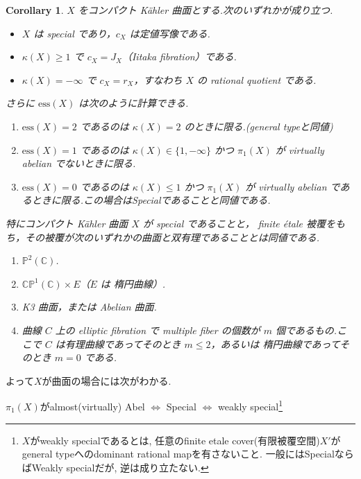 \documentclass[dvipdfmx,a4paper,11pt]{article} %
\newtheorem{cor}[thm]{Corollary}
\theoremstyle{definition}
\theoremstyle{remark}
\numberwithin{equation}{section}
\newcommand{\C}{\mathbb{C}}
\begin{document}
\begin{cor}\cite[Corollary 3.32, 3.33]{Cam04}
\(X\) をコンパクト Kähler 曲面とする.次のいずれかが成り立つ.
\begin{itemize}
\item \(X\) は special であり，\(c_X\) は定値写像である.
\item \(\kappa(X)\geq 1\) で \(c_X=J_X\)（Iitaka fibration）である.
\item \(\kappa(X)=-\infty\) で \(c_X=r_X\)，すなわち \(X\) の rational quotient である.
\end{itemize}
さらに \(\mathrm{ess}(X)\) は次のように計算できる.
\begin{enumerate}
\item \(\mathrm{ess}(X)=2\) であるのは \(\kappa(X)=2\) のときに限る.(general typeと同値)
\item \(\mathrm{ess}(X)=1\) であるのは \(\kappa(X)\in\{1,-\infty\}\) かつ \(\pi_1(X)\) が virtually abelian でないときに限る.
\item \(\mathrm{ess}(X)=0\) であるのは \(\kappa(X)\leq 1\) かつ \(\pi_1(X)\) が virtually abelian であるときに限る.この場合はSpecialであることと同値である. 
\end{enumerate}

特にコンパクト Kähler 曲面 \(X\) が special であることと， finite étale 被覆をもち，その被覆が次のいずれかの曲面と双有理であることとは同値である.
\begin{enumerate}[label=$(\alph*)$]
\item \(\mathbb{P}^2(\mathbb{C})\).
\item \(\C\mathbb{P}^1(\mathbb{C})\times E\)（\(E\) は 楕円曲線）.
\item K3 曲面，または Abelian 曲面.
\item 曲線 \(C\) 上の elliptic fibration で multiple fiber の個数が \(m\) 個であるもの.ここで \(C\) は有理曲線であってそのとき \(m\leq 2\)，あるいは 楕円曲線であってそのとき \(m=0\) である.
\end{enumerate}
\end{cor}
よって$X$が曲面の場合には次がわかる. 
\begin{center}
$\pi_1(X)$がalmost(virtually) Abel
$\Leftrightarrow$ Special
$\Leftrightarrow$ weakly special\footnote{$X$がweakly specialであるとは, 任意のfinite etale cover(有限被覆空間)$X'$がgeneral typeへのdominant rational mapを有さないこと. 一般にはSpecialならばWeakly specialだが, 逆は成り立たない. }
\end{center}
\end{document}
